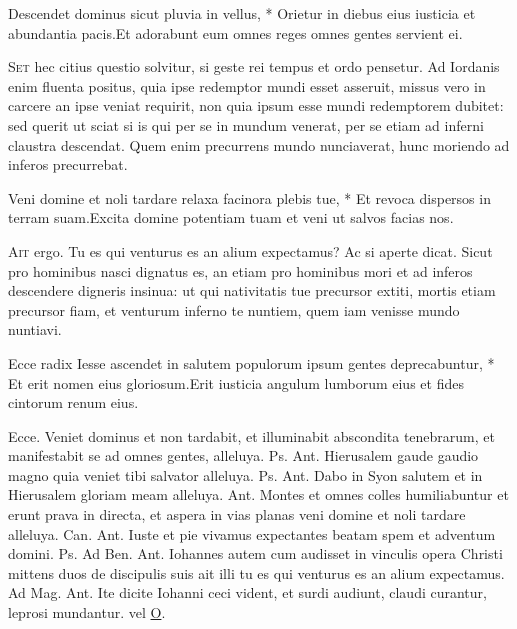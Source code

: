 \begin{multicols*}{2}
\begin{responsory}
{Descendet dominus sicut pluvia in vellus, * Orietur in diebus eius iusticia et abundantia pacis.}{Et adorabunt eum omnes reges omnes gentes servient ei.}
\end{responsory}
\lettrine[lines=2]{\zallmancaps \color{Blue} S}{et} hec citius questio solvitur, si geste rei tempus et ordo pensetur. Ad Iordanis enim fluenta positus, quia ipse redemptor mundi esset asseruit, missus vero in carcere an ipse veniat requirit, non quia ipsum esse mundi redemptorem dubitet: sed querit ut sciat si is qui per se in mundum venerat, per se etiam ad inferni claustra descendat. Quem enim precurrens mundo nunciaverat, hunc moriendo ad inferos precurrebat.
\begin{responsory}
{Veni domine et noli tardare relaxa facinora plebis tue, * Et revoca dispersos in terram suam.}{Excita domine potentiam tuam et veni ut salvos facias nos.}
\end{responsory}
\lettrine[lines=2]{\zallmancaps \color{Red} A}{it} ergo. Tu es qui venturus es an alium expectamus? Ac si aperte dicat. Sicut pro hominibus nasci dignatus es, an etiam pro hominibus mori et ad inferos descendere digneris insinua: ut qui nativitatis tue precursor extiti, mortis etiam precursor fiam, et venturum inferno te nuntiem, quem iam venisse mundo nuntiavi.
\begin{responsory-doxology}
{Ecce radix Iesse ascendet in salutem populorum ipsum gentes deprecabuntur, * Et erit nomen eius gloriosum.}{Erit iusticia angulum lumborum eius et fides cintorum renum eius.}
\end{responsory-doxology}
Ecce.
 Veniet dominus et non tardabit, et illuminabit abscondita tenebrarum, et manifestabit se ad omnes gentes, alleluya. {\color{Red} Ps.}  {\color{Red} Ant.} Hierusalem gaude gaudio magno quia veniet tibi salvator alleluya. {\color{Red} Ps.}  {\color{Red} Ant.} Dabo in Syon salutem et in Hierusalem gloriam meam alleluya.  {\color{Red} Ant.} Montes et omnes colles humiliabuntur et erunt prava in directa, et aspera in vias planas veni domine et noli tardare alleluya. {\color{Red} Can.}  {\color{Red} Ant.} Iuste et pie vivamus expectantes beatam spem et adventum domini. {\color{Red} Ps.}  {\color{Red} Ad Ben. Ant.} Iohannes autem cum audisset in vinculis opera Christi mittens duos de discipulis suis ait illi tu es qui venturus es an alium expectamus. {\color{Red} Ad Mag. Ant.} Ite dicite Iohanni ceci vident, et surdi audiunt, claudi curantur, leprosi mundantur. {\color{Red} vel} \hyperlink{o-antiphons}{O}.

\end{multicols*}
